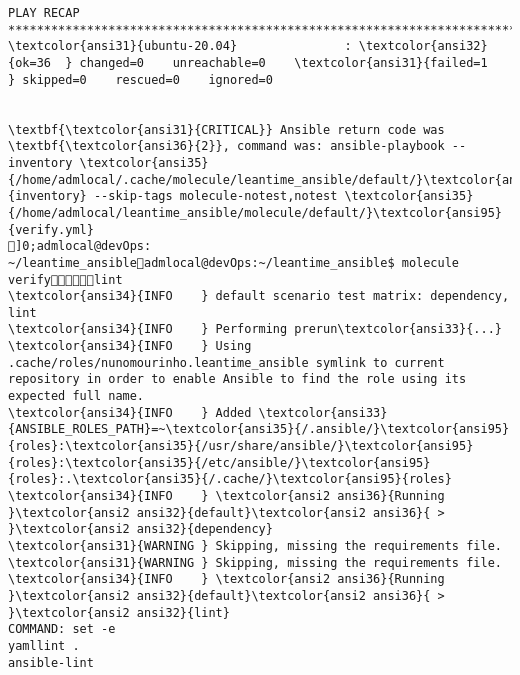 \documentclass{scrartcl}
\begin{document}
\begin{Verbatim}
PLAY RECAP *******************************************************************************************************************************
\textcolor{ansi31}{ubuntu-20.04}               : \textcolor{ansi32}{ok=36  } changed=0    unreachable=0    \textcolor{ansi31}{failed=1   } skipped=0    rescued=0    ignored=0


\textbf{\textcolor{ansi31}{CRITICAL}} Ansible return code was \textbf{\textcolor{ansi36}{2}}, command was: ansible-playbook --inventory \textcolor{ansi35}{/home/admlocal/.cache/molecule/leantime_ansible/default/}\textcolor{ansi95}{inventory} --skip-tags molecule-notest,notest \textcolor{ansi35}{/home/admlocal/leantime_ansible/molecule/default/}\textcolor{ansi95}{verify.yml}
]0;admlocal@devOps: ~/leantime_ansibleadmlocal@devOps:~/leantime_ansible$ molecule verifylint
\textcolor{ansi34}{INFO    } default scenario test matrix: dependency, lint
\textcolor{ansi34}{INFO    } Performing prerun\textcolor{ansi33}{...}
\textcolor{ansi34}{INFO    } Using .cache/roles/nunomourinho.leantime_ansible symlink to current repository in order to enable Ansible to find the role using its expected full name.
\textcolor{ansi34}{INFO    } Added \textcolor{ansi33}{ANSIBLE_ROLES_PATH}=~\textcolor{ansi35}{/.ansible/}\textcolor{ansi95}{roles}:\textcolor{ansi35}{/usr/share/ansible/}\textcolor{ansi95}{roles}:\textcolor{ansi35}{/etc/ansible/}\textcolor{ansi95}{roles}:.\textcolor{ansi35}{/.cache/}\textcolor{ansi95}{roles}
\textcolor{ansi34}{INFO    } \textcolor{ansi2 ansi36}{Running }\textcolor{ansi2 ansi32}{default}\textcolor{ansi2 ansi36}{ > }\textcolor{ansi2 ansi32}{dependency}
\textcolor{ansi31}{WARNING } Skipping, missing the requirements file.
\textcolor{ansi31}{WARNING } Skipping, missing the requirements file.
\textcolor{ansi34}{INFO    } \textcolor{ansi2 ansi36}{Running }\textcolor{ansi2 ansi32}{default}\textcolor{ansi2 ansi36}{ > }\textcolor{ansi2 ansi32}{lint}
COMMAND: set -e
yamllint .
ansible-lint


\end{Verbatim}
\end{document}
